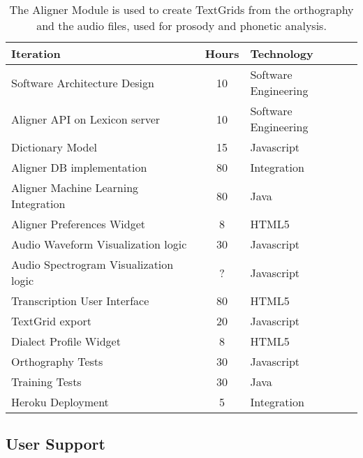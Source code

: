 \documentclass[12 pt]{article}
\begin{document}
\footnotesize
\begin{table}[htbp]
\begin{center}
  \begin{tabular}{ | lcl | }
\hline

Iteration&	Hours&	Technology	\\
\hline
Software Architecture Design&	10&	Software Engineering	\\ 
Aligner API on Lexicon server&	10&	Software Engineering\\ 
Dictionary Model&	15&	Javascript	\\ 
Aligner DB implementation&	80&	Integration	\\ 
Aligner Machine Learning Integration&	80&	Java	\\ 
Aligner Preferences Widget&	8&	HTML5	\\ 
Audio Waveform Visualization logic&	30&	Javascript	\\ 
Audio Spectrogram Visualization logic&	?&	Javascript \\ 
Transcription User Interface&	80&	HTML5	\\ 
TextGrid export&	20&  Javascript \\ 
Dialect Profile Widget&	         8&  HTML5 \\ 
Orthography Tests&	30&  Javascript \\ 
Training Tests&	30&	Java	\\ 
Heroku Deployment&	5&  Integration \\ 
\hline
  \end{tabular}
  \caption{The Aligner Module is used to create TextGrids from the orthography and the audio files, used for prosody and phonetic analysis.}
  \label{tab:label}
  \end{center}
\end{table}

\newpage
\subsection{User Support}
\end{document}
